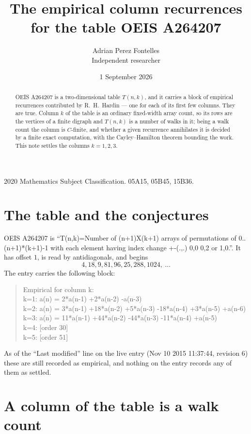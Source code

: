 \documentclass[11pt,a4paper]{article}
\title{The empirical column recurrences for the table OEIS A264207}
\author{Adrian Perez Fontelles\\ \small Independent researcher}
\date{1 September 2026}
\theoremstyle{plain}
\theoremstyle{definition}
\begin{document}
\maketitle

\begin{abstract}
OEIS A264207 is a two-dimensional table $T(n,k)$, and it carries a block of empirical
recurrences contributed by R.~H.~Hardin --- one for each of its first few columns. They are
true. Column $k$ of the table is an ordinary fixed-width array count, so its rows are the
vertices of a finite digraph and $T(n,k)$ is a number of walks in it; being a walk count the
column is $C$-finite, and whether a given recurrence annihilates it is decided by a finite
exact computation, with the Cayley--Hamilton theorem bounding the work. This note settles the columns $k=1, 2, 3$.
\end{abstract}

\noindent\small 2020 Mathematics Subject Classification. 05A15, 05B45, 15B36.\normalsize

\section{The table and the conjectures}

OEIS A264207 is ``T(n,k)=Number of (n+1)X(k+1) arrays of permutations of 0..(n+1)*(k+1)-1 with each element having index change +-(.,.) 0,0 0,2 or 1,0.''. It has offset $1$, is
read by antidiagonals, and begins
\[
4, 18, 9, 81, 96, 25, 288, 1024,\ \dots
\]
The entry carries the following block:
\begin{quote}\small
Empirical for column k:\\
k=1: a(n) = 2*a(n-1) +2*a(n-2) -a(n-3)\\
k=2: a(n) = 3*a(n-1) +18*a(n-2) +5*a(n-3) -18*a(n-4) +3*a(n-5) +a(n-6)\\
k=3: a(n) = 11*a(n-1) +44*a(n-2) -44*a(n-3) -11*a(n-4) +a(n-5)\\
k=4: [order 30]\\
k=5: [order 51]\\
\end{quote}
As of the ``Last modified'' line on the live entry (Nov 10 2015 11:37:44, revision 6) these are still
recorded as empirical, and nothing on the entry records any of them as settled.

\section{A column of the table is a walk count}
\end{document}
